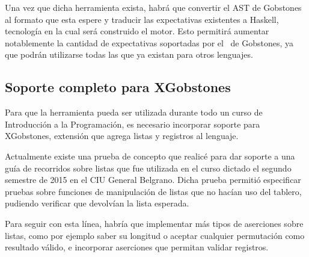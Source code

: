 Una vez que dicha herramienta exista, habrá que convertir el AST de Gobstones al formato que esta espere y traducir las expectativas existentes a Haskell, tecnología en la cual será construido el motor. Esto permitirá aumentar notablemente la cantidad de expectativas soportadas por el \runner\ de Gobstones, ya que podrán utilizarse todas las que ya existan para otros lenguajes.

\subsection{Soporte completo para XGobstones}
Para que la herramienta pueda ser utilizada durante todo un curso de Introducción a la Programación, es necesario incorporar soporte para XGobstones, extensión que agrega listas y registros al lenguaje.

Actualmente existe una prueba de concepto que realicé para dar soporte a una guía de recorridos sobre listas que fue utilizada en el curso dictado el segundo semestre de 2015 en el CIU General Belgrano. Dicha prueba permitió especificar pruebas sobre funciones de manipulación de listas que no hacían uso del tablero, pudiendo verificar que devolvían la lista esperada.

Para seguir con esta línea, habría que implementar más tipos de aserciones sobre listas, como por ejemplo saber su longitud o aceptar cualquier permutación como resultado válido, e incorporar aserciones que permitan validar registros.
